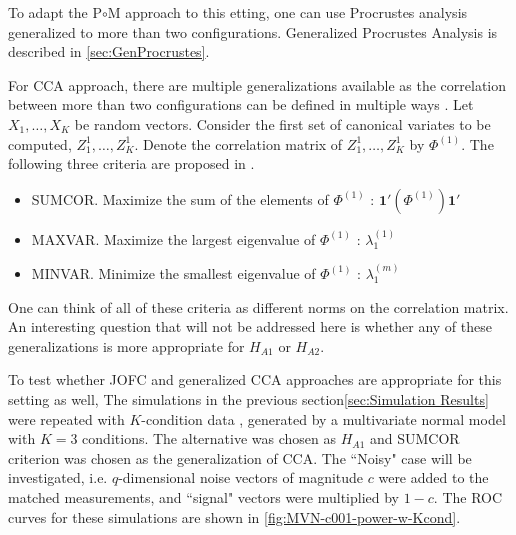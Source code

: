 \documentclass[12pt,oneside,final]{thesis}\usepackage[]{graphicx}\usepackage[]{color}
\begin{document}
To adapt the P$\circ$M approach to this etting, one can use Procrustes analysis  generalized to more than two configurations. Generalized Procrustes Analysis \cite{GPCA} is described in \ref{sec:GenProcrustes}.

For CCA approach, there are multiple generalizations available as the correlation between more than two configurations can be defined in multiple ways \cite{generalCCA}. Let $X_1,\ldots,X_K$ be random vectors. Consider the first set of canonical variates to be computed, $Z_1^{1},\ldots,Z_K^{1}$. Denote  the correlation matrix of  $Z_1^{1},\ldots,Z_K^{1}$ by $\Phi^{(1)}$.   The following three criteria  are proposed in \cite{generalCCA}.
\begin{itemize}
\item SUMCOR. Maximize the sum of the elements of $\Phi^{(1)}$ : $\mathbf{1'}(\Phi^{(1)})\mathbf{1'}$
\item MAXVAR. Maximize the largest eigenvalue of $\Phi^{(1)}$ : $\lambda^{(1)}_1$ 
\item  MINVAR. Minimize  the smallest eigenvalue of $\Phi^{(1)}$ : $\lambda^{(m)}_1$ 
\end{itemize}
One can think of all of these criteria as different norms on the correlation matrix.
An interesting question that will not be addressed here is whether any of these generalizations is more appropriate for $H_{A1}$ or $H_{A2}$.

To test whether JOFC and generalized CCA approaches are appropriate for this setting as well,
The simulations in the previous section\ref{sec:Simulation Results} were repeated with $K$-condition data , generated by a multivariate normal model with $K=3$ conditions. 
The alternative was chosen as $ H_{A1}$ and SUMCOR criterion was chosen as the generalization of CCA.
 The ``Noisy" case will be investigated, i.e. 
 $q$-dimensional noise vectors of magnitude $c$ were added to the matched measurements, and ``signal" vectors were multiplied by $1-c$.  
 The ROC curves for these simulations are shown in \ref{fig:MVN-c001-power-w-Kcond}.
\end{document}
